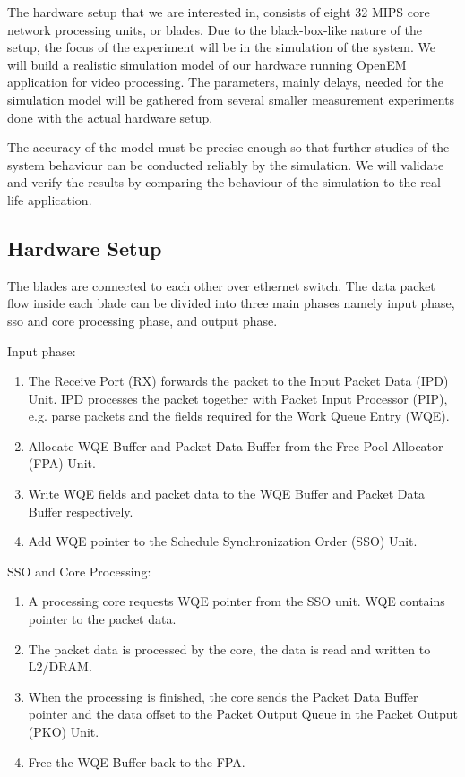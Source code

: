 The hardware setup that we are interested in, consists of eight 32 MIPS core network processing units, or blades. Due to the black-box-like nature of the setup, the focus of the experiment will be in the simulation of the system. We will build a realistic simulation model of our hardware running OpenEM application for video processing. The parameters, mainly delays, needed for the simulation model will be gathered from several smaller measurement experiments done with the actual hardware setup.

The accuracy of the model must be precise enough so that further studies of the system behaviour can be conducted reliably by the simulation. We will validate and verify the results by comparing the behaviour of the simulation to the real life application.

\subsection{Hardware Setup}
The blades are connected to each other over ethernet switch. The data packet flow inside each blade can be divided into three main phases namely input phase, sso and core processing phase, and output phase.

Input phase:
\begin{enumerate}
\item The Receive Port (RX) forwards the packet to the Input Packet Data (IPD) Unit. IPD processes the packet together with Packet Input Processor (PIP), e.g. parse packets and the fields required for the Work Queue Entry (WQE).
\item Allocate WQE Buffer and Packet Data Buffer from the Free Pool Allocator (FPA) Unit.
\item Write WQE fields and packet data to the WQE Buffer and Packet Data Buffer respectively.
\item Add WQE pointer to the Schedule Synchronization Order (SSO) Unit.
\end{enumerate}

SSO and Core Processing:
\begin{enumerate}
\item A processing core requests WQE pointer from the SSO unit. WQE contains pointer to the packet data.
\item The packet data is processed by the core, the data is read and written to L2/DRAM.
\item When the processing is finished, the core sends the Packet Data Buffer pointer and the data offset to the Packet Output Queue in the Packet Output (PKO) Unit.
\item Free the WQE Buffer back to the FPA.
\end{enumerate}


